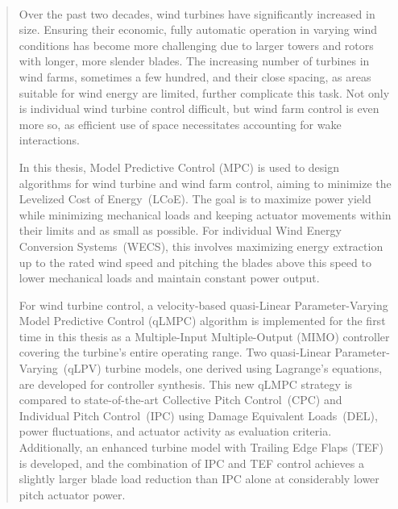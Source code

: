 \documentclass[12pt,a4paper,twoside]{report}
\begin{document}
 \clearpage
 \pagestyle{empty}   %
 ~
 \clearpage
 
    \cleardoublepage
    \begin{abstract}
        

        
          Over the past two decades, wind turbines have significantly increased in size. Ensuring their economic, fully automatic operation in varying wind conditions has become more challenging due to larger towers and rotors with longer, more slender blades. The increasing number of turbines in wind farms, sometimes a few hundred, and their close spacing, as areas suitable for wind energy are limited, further complicate this task. Not only is individual wind turbine control difficult, but wind farm control is even more so, as efficient use of space necessitates accounting for wake interactions.
          
        In this thesis, Model Predictive Control (MPC) is used to design algorithms for wind turbine and wind farm control, aiming to minimize the Levelized Cost of Energy~(LCoE). The goal is to maximize power yield while minimizing mechanical loads and keeping actuator movements within their limits and as small as possible. For individual Wind Energy Conversion Systems~(WECS), this involves maximizing energy extraction up to the rated wind speed and pitching the blades above this speed to lower mechanical loads and maintain constant power output.
           
    For wind turbine control, a velocity-based quasi-Linear Parameter-Varying Model Predictive Control (qLMPC) algorithm is implemented for the first time in this thesis as a Multiple-Input Multiple-Output (MIMO) controller covering the turbine's entire operating range. Two quasi-Linear Parameter-Varying~(qLPV) turbine models, one derived using Lagrange's equations, are developed for controller synthesis. This new qLMPC strategy is compared to state-of-the-art Collective Pitch Control~(CPC) and Individual Pitch Control~(IPC) using Damage Equivalent Loads~(DEL), power fluctuations, and actuator activity as evaluation criteria. Additionally, an enhanced turbine model with Trailing Edge Flaps (TEF) is developed, and the combination of IPC and TEF control achieves a slightly larger blade load reduction than IPC alone at considerably lower pitch actuator power.
        
        


\end{abstract}
\end{document}
